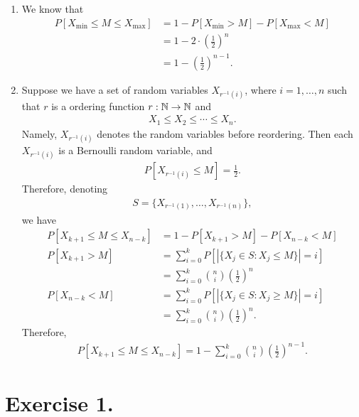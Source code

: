 \begin{enumerate}
	\item We know that
	\begin{align*}
	P[X_{\min} \leq M \leq X_{\max}] & = 1 - P[X_{\min} > M] - P[X_{\max} < M] \\
	& = 1 - 2\cdot \left(\frac{1}{2} \right)^n \\
	& = 1 - \left(\frac{1}{2} \right)^{n-1}.
	\end{align*}
	\item Suppose we have a set of random variables $X_{r^{-1}(i)}$, where $i = 1, \ldots, n$ such that $r$ is a ordering function $r: \mathbb{N}\rightarrow \mathbb{N}$ and
	\begin{align*}
	X_{1} \leq X_{2} \leq \cdots \leq X_{n}.
	\end{align*}
	Namely, $X_{r^{-1}(i)}$ denotes the random variables before reordering. Then each $X_{r^{-1}(i)}$ is a Bernoulli random variable, and
	\begin{align*}
	P[X_{r^{-1}(i)}\leq M] = \frac{1}{2}.
	\end{align*}
	Therefore, denoting
	\begin{align*}
	S = \{X_{r^{-1}(1)}, \ldots, X_{r^{-1}(n)} \},
	\end{align*}
	we have
	\begin{align*}
	P[X_{k+1}\leq M\leq X_{n-k}] & = 1 - P[X_{k+1} > M] - P[X_{n-k} < M] \\
	P[X_{k+1} > M] & = \sum_{i=0}^k P\left[\left|\{X_j\in S: X_j \leq M \}\right| = i\right] \\
	& = \sum_{i=0}^k\binom{n}{i}\left(\frac{1}{2} \right)^n \\
	P[X_{n-k} < M] & = \sum_{i=0}^k P\left[\left|\{X_j\in S: X_j \geq M \}\right| = i\right] \\
	& = \sum_{i=0}^k \binom{n}{i} \left(\frac{1}{2} \right)^n.
	\end{align*}
	Therefore,
	\begin{align*}
	P[X_{k+1}\leq M\leq X_{n-k}] = 1 - \sum_{i=0}^k \binom{n}{i} \left(\frac{1}{2} \right)^{n-1}.
	\end{align*}
\end{enumerate}



\section*{Exercise 1.}

